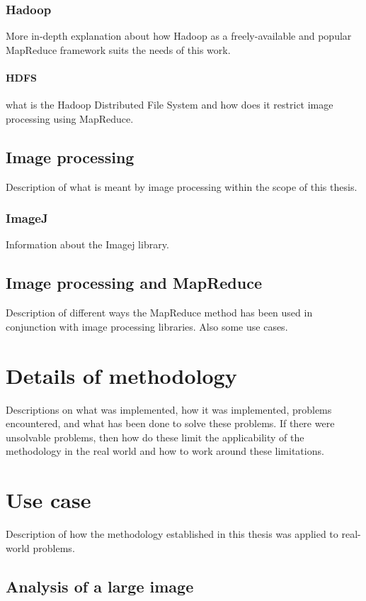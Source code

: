 \documentclass [12pt,a4paper]{report}
\begin{document}
\subsection{Hadoop}
More in-depth explanation about how Hadoop as a freely-available and popular MapReduce framework suits the needs of this work.
\subsubsection{HDFS}
what is the Hadoop Distributed File System and how does it restrict image processing using MapReduce.

\section{Image processing}
Description of what is meant by image processing within the scope of this thesis.
\subsection{ImageJ}
Information about the Imagej library. 


\section{Image processing and MapReduce}
Description of different ways the MapReduce method has been used in conjunction with image processing libraries. Also some use cases.

\chapter{Details of methodology}
Descriptions on what was implemented, how it was implemented, problems encountered, and what has been done to solve these problems. If there were unsolvable problems, then how do these limit the applicability of the methodology in the real world and how to work around these limitations.

\chapter{Use case}
Description of how the methodology established in this thesis was applied to real-world problems.

\section{Analysis of a large image}
\end{document}
